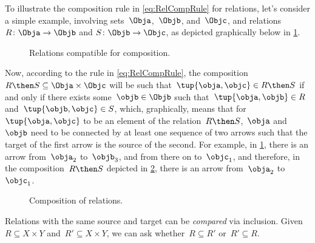 To illustrate the composition rule in \cref{eq:RelCompRule} for relations, let's consider a simple example, involving sets~$\Obja$,~$\Objb$, and~$\Objc$, and relations~$R \colon \Obja \to \Objb$ and $S \colon \Objb \to \Objc$, as depicted graphically below in \cref{fig:example_rel_composable}.
%
\begin{figure}[h!]
  \centering
  \caption{Relations compatible for composition.}
  \label{fig:example_rel_composable}
\end{figure}
%
Now, according to the rule in \cref{eq:RelCompRule}, the composition~$R \then S \subseteq \Obja \times \Objc$ will be such that~$\tup{\obja,\objc} \in R \then S$ if and only if there exists some~$\objb \in \Objb$ such that~$\tup{\obja,\objb} \in R$ and~$\tup{\objb,\objc} \in S$, which, graphically, means that for~$\tup{\obja,\objc}$ to be an element of the relation~$R \then S$,~$\obja$ and~$\objb$ need to be connected by at least one sequence of two arrows such that the target of the first arrow is the source of the second.
For example, in \cref{fig:example_rel_composable}, there is an arrow from~$\obja_2$ to~$\objb_3$, and from there on to~$\objc_1$, and therefore, in the composition~$R \then S$ depicted in \cref{fig:example_rel_composed}, there is an arrow from~$\obja_2$ to~$\objc_1$.
%
\begin{figure}[h!]
  \centering
  \caption{Composition of relations.}
  \label{fig:example_rel_composed}
\end{figure}

\begin{remark}
  Relations with the same source and target can be \emph{compared} via inclusion.
  Given~$R\subseteq X\times Y$ and~$R'\subseteq X\times Y$, we can ask whether~$R\subseteq R'$ or~$R'\subseteq R$.
\end{remark}
